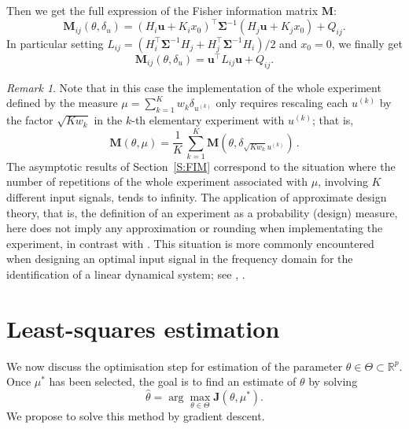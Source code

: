 \documentclass[a4paper]{article}
\theoremstyle{definition}
\theoremstyle{remark}
\newtheorem{remark}[theorem]{Remark}
\newcommand{\R}{\mathbb{R}}
\newcommand{\V}{\mathcal{V}}
\newcommand{\ub}{\mathbf{u}}
\newcommand{\Jb}{\mathbf{J}}
\newcommand{\Mb}{\mathbf{M}}
\newcommand{\Sigmab}{\boldsymbol{\Sigma}}
\begin{document}
Then we get the full expression of the Fisher information matrix $\Mb$:
\begin{equation}
    \Mb_{ij}(\theta,\delta_{u})
    =
    \left(H_i \ub + K_i x_0\right)^\top \Sigmab^{-1}\left(H_j \ub + K_j x_0\right) + Q_{ij}.
\end{equation}
In particular setting $L_{ij}=(H_i^\top \Sigmab^{-1} H_j+H_j^\top \Sigmab^{-1} H_i)/2$ and $x_0=0$,
we finally get
\begin{equation}
    \Mb_{ij}(\theta,\delta_{u})
    =
    \ub^\top L_{ij} \ub+ Q_{ij}.
\end{equation}


\begin{remark}\label{R:approximate-design}
Note that in this case the implementation of the whole experiment defined by the measure $\mu=\sum_{k=1}^K w_k\delta_{u^{(k)}}$ only requires rescaling each $u^{(k)}$ by the factor $\sqrt{Kw_k}$ in the $k$-th elementary experiment with $u^{(k)}$; that is,
$$
\Mb(\theta,\mu) = \frac1K\, \sum_{k=1}^K \Mb(\theta,\delta_{\sqrt{Kw_k}u^{(k)}}) \,.
$$
The asymptotic results of Section~\ref{S:FIM} correspond to the situation where the number of repetitions of the whole experiment associated with $\mu$, involving $K$ different input signals, tends to infinity.
%
The application of approximate design theory, that is, the definition of an experiment as a probability (design) measure, here does not imply any approximation or rounding when implementating the experiment, in contrast with \cite{PukelsheimR92}. This situation is more commonly encountered when designing an optimal input signal in the frequency domain for the identification of a linear dynamical system; see \cite[Chap.~6]{GoodwinP77}, \cite{Zarrop79}.
\end{remark}


\section{Least-squares estimation}

We now discuss the optimisation step for estimation of the parameter $\theta\in \Theta\subset \R^p$. Once $\mu^*$ has been selected, the goal is to find an estimate of $\theta$ by solving 
\begin{equation}
    \hat \theta=\arg\max_{\theta\in \Theta}\Jb(\theta,\mu^*).
\end{equation}
We propose to solve this method by gradient descent.
\end{document}
